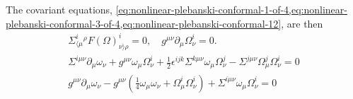 \documentclass[10pt]{report}
\theoremstyle{definition}
\begin{document}
        The covariant equations,  \cref{eq:nonlinear-plebanski-conformal-1-of-4,eq:nonlinear-plebanski-conformal-3-of-4,eq:nonlinear-plebanski-conformal-12}, are then
        \begin{gather}
        \Sigma^i_{\langle\mu}{}^\rho F(\Omega)^i_{\nu\rangle\rho} = 0, \quad g^{\mu\nu} \partial_\mu \Omega^i_\nu = 0. \label{eq:num-conformal-covariant-connection-system} \\
        \Sigma^{i\mu\nu} \partial_\mu \omega_\nu + g^{\mu\nu} \omega_\mu \Omega^i_\nu + \frac{1}{2} \epsilon^{ijk} \Sigma^{k\mu\nu} \omega_\mu \Omega^j_\nu - \Sigma^{j\mu\nu} \Omega^j_\mu \Omega^i_\nu = 0 \label{eq:num-conformal-3-of-4-covariant-connection-system} \\
        g^{\mu\nu} \partial_\mu \omega_\nu - g^{\mu\nu} \left(\frac{1}{4} \omega_\mu \omega_\nu + \Omega^i_\mu \Omega^i_\nu\right) + \Sigma^{i\mu\nu} \omega_\mu \Omega^i_\nu = 0 \label{eq:num-conformal-1-of-4-covariant-connection-system}
        \end{gather}
\end{document}
